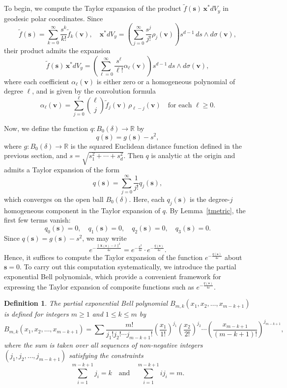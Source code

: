 \documentclass{amsart}
\theoremstyle{Theorem}
\newtheorem{defn}[theorem]{Definition}
\theoremstyle{remark}
\numberwithin{equation}{section} \numberwithin{figure}{section}
\renewcommand*{\to}{\rightarrow}
\begin{document}
To begin, we compute the Taylor expansion of the product \( \widetilde{f}(\mathbf{s}) \, \mathbf{x}^* dV_y \) in geodesic polar coordinates. Since
\[
\widetilde{f}(\mathbf{s}) = \sum_{k=0}^{\infty} \frac{s^k}{k!} \widetilde{f}_k(\mathbf{v}), \quad 
\mathbf{x}^* dV_y = \left( \sum_{j=0}^{\infty} \frac{s^j}{j!} \rho_j(\mathbf{v}) \right) s^{d-1} \, ds \wedge d\sigma(\mathbf{v}),
\]
their product admits the expansion
\[
\widetilde{f}(\mathbf{s}) \, \mathbf{x}^* dV_y = 
\left( \sum_{\ell=0}^{\infty} \frac{s^{\ell}}{\ell!} \alpha_{\ell}(\mathbf{v}) \right) s^{d-1} \, ds \wedge d\sigma(\mathbf{v}),
\]
where each coefficient \( \alpha_{\ell}(\mathbf{v}) \) is either zero or a homogeneous polynomial of degree \( \ell \), and is given by the convolution formula
\[
\alpha_{\ell}(\mathbf{v}) = \sum_{j=0}^{\ell} \binom{\ell}{j} \widetilde{f}_j(\mathbf{v}) \, \rho_{\ell - j}(\mathbf{v})
\quad \text{for each } \ell \geq 0.
\]


Now, we define the function \( q : B_0(\delta) \to \mathbb{R} \) by
\[
q(\mathbf{s}) = g(\mathbf{s}) - s^2,
\]
where \( g : B_0(\delta) \to \mathbb{R} \) is the squared Euclidean distance function defined in the previous section, and \( s = \sqrt{s_1^2 + \cdots + s_d^2} \). Then \( q \) is analytic at the origin and admits a Taylor expansion of the form
\[
q(\mathbf{s}) = \sum_{j=0}^{\infty} \frac{1}{j!} q_j(\mathbf{s}),
\]
which converges on the open ball \( B_0(\delta) \). Here, each \( q_j(\mathbf{s}) \) is the degree-\( j \) homogeneous component in the Taylor expansion of \( q \).  
By Lemma~\ref{tmetric}, the first few terms vanish:
\[
q_0(\mathbf{s}) = 0, \quad
q_1(\mathbf{s}) = 0, \quad
q_2(\mathbf{s}) = 0, \quad
q_3(\mathbf{s}) = 0.
\]
Since \( q(\mathbf{s}) = g(\mathbf{s}) - s^2 \), we may write
\[
e^{-\frac{\| \mathbf{x}(\mathbf{s}) - x \|^2}{4\varepsilon}} = e^{-\frac{s^2}{4\varepsilon}} \cdot e^{-\frac{q(\mathbf{s})}{4\varepsilon}}.
\]
Hence, it suffices to compute the Taylor expansion of the function \( e^{-\frac{q(\mathbf{s})}{4\varepsilon}} \) about \( \mathbf{s} = 0 \).  
To carry out this computation systematically, we introduce the partial exponential Bell polynomials, which provide a convenient framework for expressing the Taylor expansion of composite functions such as \( e^{-\frac{q(\mathbf{s})}{4\varepsilon}} \).

\begin{defn}
The \emph{partial exponential Bell polynomial} \( B_{m,k}(x_1, x_2, \dots, x_{m-k+1}) \) is defined for integers \( m \geq 1 \) and \( 1 \leq k \leq m \) by
\[
B_{m,k}(x_1, x_2, \dots, x_{m-k+1}) = \sum \frac{m!}{j_1! j_2! \cdots j_{m-k+1}!}
\left( \frac{x_1}{1!} \right)^{j_1}
\left( \frac{x_2}{2!} \right)^{j_2}
\cdots
\left( \frac{x_{m-k+1}}{(m-k+1)!} \right)^{j_{m-k+1}},
\]
where the sum is taken over all sequences of non-negative integers \( (j_1, j_2, \dots, j_{m-k+1}) \) satisfying the constraints
\[
\sum_{i=1}^{m-k+1} j_i = k \quad \text{and} \quad \sum_{i=1}^{m-k+1} i j_i = m.
\]
\end{defn}
\end{document}

